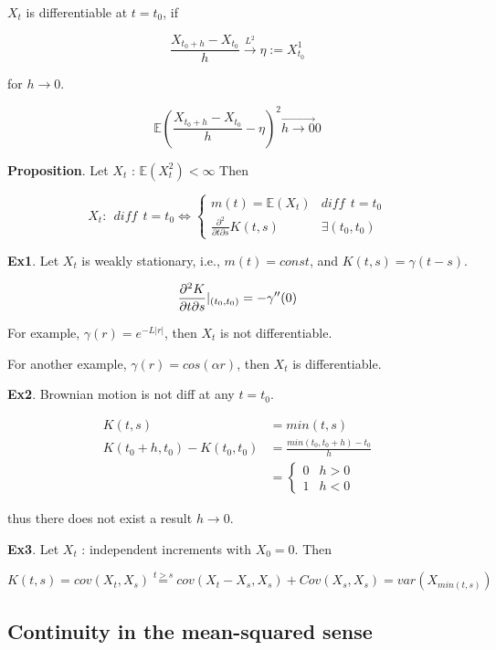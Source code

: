 \documentclass[12pt]{article}
\theoremstyle{nonumberbreak}
\begin{document}
$X_t$ is differentiable at $t=t_0$, if 

$$
\frac{X_{t_0 + h} - X_{t_0}}{h} \overset{L^2}{\to} \eta := X^1_{t_0}
$$

for $h \to 0$. 

$$
\mathbb{E} \left(  \frac{X_{t_0 + h}  - X_{t_0}}{h} - \eta \right)^2 \overset{\to}{h \to 0} 0
$$



\begin{theorem}
\textbf{Proposition}. Let $X_t$ : $\mathbb{E} (X_t^2) < \infty$ Then

$$
X_t: \ \ diff \ \ t=t_0 \Leftrightarrow \begin{cases}
m(t) = \mathbb{E}(X_t) & diff \ \ t=t_0 \\
\frac{\partial^2}{\partial t \partial s} K(t,s) & \exists (t_0, t_0)
\end{cases}
$$

\end{theorem}




\textbf{Ex1}. Let $X_t$ is weakly stationary, i.e., $m(t) = const$, and $K(t,s) = \gamma(t-s)$. 

$$
\frac{\partial^2 K}{\partial t \partial s} \Large|_{(t_0,t_0)} = - \gamma''(0)
$$

For example, $\gamma(r) = e^{-L|r|}$, then $X_t$ is not differentiable. 

For another example, $\gamma(r) = cos(\alpha r)$, then $X_t$ is differentiable. 


\textbf{Ex2}. Brownian motion is not diff at any $t=t_0$. 

$$
\begin{aligned}
K(t,s) &= min(t,s) \\[10pt]
K(t_0 + h, t_0) - K(t_0, t_0) &= \frac{min(t_0, t_0+h) - t_0}{h} \\[8pt]
&= \begin{cases} 0 & h >0 \\ 1 & h <0 \end{cases}
\end{aligned}
$$

thus there does not exist a result $h\to 0$.  

\textbf{Ex3}. Let $X_t$ : independent increments with $X_0 = 0$. Then 

$$
K(t,s) = cov(X_t, X_s) \overset{t>s}{=} cov(X_t - X_s, X_s) + Cov(X_s, X_s) = var(X_{min(t,s)})
$$



\subsection{Continuity in the mean-squared sense}
\end{document}
